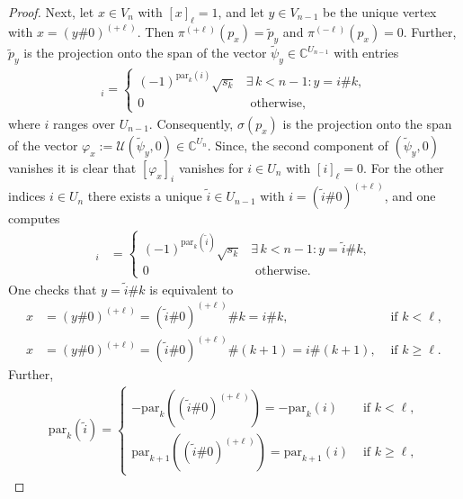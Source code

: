 \documentclass[10pt,a4paper]{amsart}
\newcommand{\C}{\mathbb{C}}
\begin{document}
\begin{proof}
    Next, let $x \in V_n$ with $[x]_\ell = 1$, and let $y \in V_{n-1}$ be the unique vertex with $x = (y \# 0)^{(+\ell)}$. Then $\pi^{(+\ell)}(p_x) = \tilde{p}_y$ and $\pi^{(-\ell)}(p_x) = 0$. Further, $\tilde{p}_y$ is the projection onto the span of the vector $\tilde{\psi}_y \in \C^{U_{n-1}}$ with entries
    \begin{align*}
        [\tilde{\psi}_y]_i = \begin{cases}
            (-1)^{\mathrm{par}_k(i)} \sqrt{s_k}     &\exists \, k < n-1 : y = i \# k, \\
            0                                       &\text{ otherwise},
        \end{cases}
    \end{align*}
    where $i$ ranges over $U_{n-1}$.
    Consequently, $\sigma(p_x)$ is the projection onto the span of the vector $\varphi_x := \mathcal{U} (\tilde{\psi}_y, 0) \in \C^{U_n}$. Since, the second component of $(\tilde{\psi}_y, 0)$ vanishes it is clear that $[\varphi_x]_i$ vanishes for $i \in U_n$ with $[i]_\ell = 0$. For the other indices $i \in U_n$ there exists a unique $\tilde{i} \in U_{n-1}$ with $i = (\tilde{i} \# 0)^{(+\ell)}$, and one computes
    \begin{align*}
        [\varphi_x]_{i} &= \begin{cases}
            (-1)^{\mathrm{par}_k(\tilde{i})} \sqrt{s_k}     &\exists \, k < n-1 : y = \tilde{i} \# k, \\
            0                                       &\text{ otherwise.}
        \end{cases}
    \end{align*}
    One checks that $y = \tilde{i} \# k$ is equivalent to
    \begin{align*}
            x &= (y \# 0)^{(+\ell)} = (\tilde{i} \# 0)^{(+\ell)} \# k = i \# k, & \text{ if } k < \ell, \\
            x &= (y \# 0)^{(+\ell)} = (\tilde{i} \# 0)^{(+\ell)} \# (k+1) = i \# (k+1), & \text{ if } k \geq \ell.
    \end{align*}
    Further,
    \begin{align*}
        \mathrm{par}_k(\tilde{i}) = \begin{cases}
            - \mathrm{par}_k((\tilde{i} \# 0)^{(+\ell)}) = -\mathrm{par}_k(i)    &\text{ if } k < \ell, \\
            \mathrm{par}_{k+1}((\tilde{i} \# 0)^{(+\ell)}) = \mathrm{par}_{k+1}(i)   &\text{ if } k \geq \ell,
        \end{cases}

\end{align*}
\end{proof}
\end{document}
